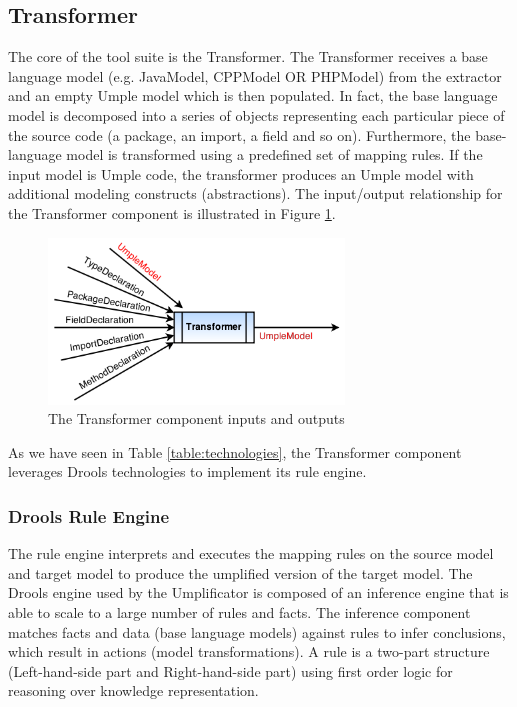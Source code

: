 \subsection{Transformer}

The core of the tool suite is the Transformer. The Transformer receives a base language model (e.g. JavaModel, CPPModel OR PHPModel) from the extractor and an empty Umple model which is then populated. In fact, the base language model is decomposed into a series of objects representing each particular piece of the source code (a package, an import, a field and so on). Furthermore, the base-language model is transformed using a predefined set of mapping rules. If the input model is Umple code, the transformer produces an Umple model with additional modeling constructs (abstractions). The input/output relationship for the Transformer component is illustrated in Figure 
\ref{fig:transformerInOut}.

\begin{figure}[h]
\centering
\includegraphics[width=0.70\textwidth]{Figures/transformerINOut.png}
\caption{The Transformer component inputs and outputs}
\label{fig:transformerInOut}
\end{figure}

As we have seen in Table \ref{table:technologies}, the Transformer component leverages Drools technologies to implement its rule engine.

\subsubsection{Drools Rule Engine}

The rule engine interprets and executes the mapping rules on the source model and target model to produce the umplified version of the target model.
The Drools engine used by the Umplificator is composed of an inference engine that is able to scale to a large number of rules and facts.  The inference component matches facts and data (base language models) against rules to infer conclusions, which result in actions (model transformations). A rule is a two-part structure (Left-hand-side part and Right-hand-side part) using first order logic for reasoning over knowledge representation.

